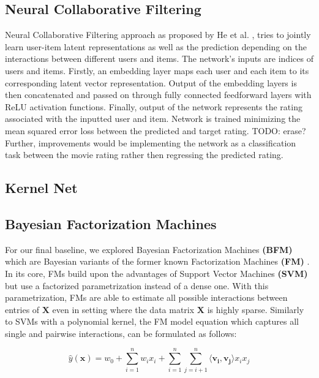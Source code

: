 \documentclass[10pt,conference,compsocconf]{IEEEtran}
\begin{document}
    \subsection{Neural Collaborative Filtering}
    Neural Collaborative Filtering approach as proposed by He et al. \cite{DBLP:journals/corr/abs-1708-05031}, tries to
    jointly learn user-item latent representations as well as the prediction depending on the interactions between
    different users and items. The network's inputs are indices of users and items. Firstly, an embedding layer maps
    each user and each item to its corresponding latent vector representation. Output of the embedding layers is then
    concatenated and passed on through fully connected feedforward layers with ReLU activation functions. Finally,
    output of the network represents the rating associated with the inputted user and item. Network is trained minimizing
    the mean squared error loss between the predicted and target rating. TODO: erase? Further, improvements would be
    implementing the network as a classification task between the movie rating rather then regressing the predicted rating.

    \subsection{Kernel Net}

    \subsection{Bayesian Factorization Machines}
    For our final baseline, we explored Bayesian Factorization Machines \textbf{(BFM)} which are Bayesian variants of the former known Factorization Machines \textbf{(FM)} \cite{rendle_factorization_2010}.
    In its core, FMs build upon the advantages of Support Vector Machines \textbf{(SVM)} but use a factorized parametrization instead of a dense one.
    With this parametrization, FMs are able to estimate all possible interactions between entries of $\mathbf{X}$ even in setting where the data matrix $\mathbf{X}$ is highly sparse.
    Similarly to SVMs with a polynomial kernel, the FM model equation which captures all single and pairwise interactions, can be formulated as follows:

    $$\hat{y}(\mathbf{x})=w_0+\sum^n_{i=1}w_ix_i + \sum^n_{i=1}\sum^n_{j=i+1}\langle \mathbf{v_i},\mathbf{v_j} \rangle x_ix_j$$
\end{document}
